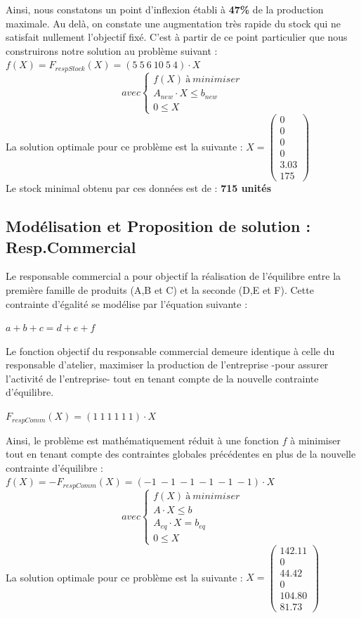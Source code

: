 \documentclass[a4paper, 11pt]{article}
\begin{document}
Ainsi, nous constatons un point d'inflexion établi à \textbf{47\%} de la production maximale. Au delà, on constate une augmentation très rapide du stock qui ne satisfait nullement l'objectif fixé.
C'est à partir de ce point particulier que nous construirons notre solution au problème suivant :
$f(X) = F_{respStock} (X) =(5~5~6~10~5~4)\cdot X$ \\
$$
avec \left\{\begin{split}
	f(X)\ à\ minimiser\\
    A_{new}\cdot X \leq b_{new}\\
    0 \leq X
\end{split}\right.
$$
La solution optimale pour ce problème est la suivante :
$ X =\begin{pmatrix}
0\\
0\\
0\\
0\\
3.03\\
175
\end{pmatrix} $\\
Le stock minimal obtenu par ces données est de : \textbf{715 unités}

\subsection{Modélisation et Proposition de solution : Resp.Commercial}
Le responsable commercial a pour objectif la réalisation de l'équilibre entre la première famille de produits (A,B et C) et la seconde (D,E et F). Cette contrainte d'égalité se modélise par l'équation suivante :
\begin{center}
$ a+ b+ c = d+ e+ f $
\end{center}
Le fonction objectif du responsable commercial demeure identique à celle du responsable d'atelier, maximiser la production de l'entreprise -pour assurer l'activité de l'entreprise- tout en tenant compte de la nouvelle contrainte d'équilibre.
\begin{center}
$F_{respComm} (X) =(1~1~1~1~1~1)\cdot X$ \\
\end{center}
Ainsi, le problème est mathématiquement réduit à une fonction $f$ à minimiser tout en tenant compte des contraintes globales précédentes en plus de la nouvelle contrainte d'équilibre :
$f(X) = -F_{respComm} (X) =(-1~-1~-1~-1~-1~-1)\cdot X$ \\
$$
avec \left\{\begin{split}
	f(X)\ à\ minimiser\\
    A\cdot X \leq b\\
    A_{eq}\cdot X = b_{eq}\\
    0 \leq X
\end{split}\right.
$$
La solution optimale pour ce problème est la suivante :
$ X =\begin{pmatrix}
142.11\\
0\\
44.42\\
0\\
104.80\\
81.73
\end{pmatrix} $\\
\end{document}
